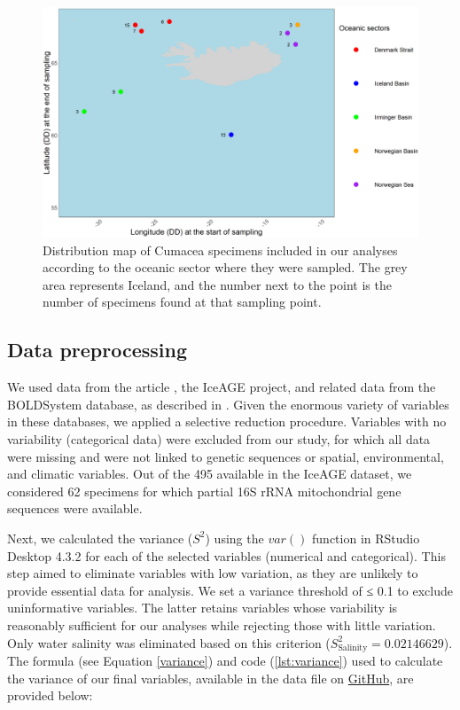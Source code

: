 \begin{figure}[htbp]
    \centering
    \includegraphics[width=\textwidth]{figuremap.png}
    \caption{Distribution map of Cumacea specimens included in our analyses according to the oceanic sector where they were sampled. The grey area represents Iceland, and the number next to the point is the number of specimens found at that sampling point. \label{fig:fig2}}
\end{figure}

\subsection{Data preprocessing}
We used data from the article \citep{uhlir_adding_2021}, the IceAGE project, and related data from the BOLDSystem database, as described in \citep{uhlir_adding_2021}. Given the enormous variety of variables in these databases, we applied a selective reduction procedure. Variables with no variability (categorical data) were excluded from our study, for which all data were missing and were not linked to genetic sequences or spatial, environmental, and climatic variables. Out of the 495 available in the IceAGE dataset, we considered 62 specimens for which partial 16S rRNA mitochondrial gene sequences were available.

Next, we calculated the variance ($S^2$) using the $var()$ function in RStudio Desktop 4.3.2 for each of the selected variables (numerical and categorical). This step aimed to eliminate variables with low variation, as they are unlikely to provide essential data for analysis. We set a variance threshold of ≤ 0.1 to exclude uninformative variables. The latter retains variables whose variability is reasonably sufficient for our analyses while rejecting those with little variation. Only water salinity was eliminated based on this criterion ($S^2_\text{Salinity} = 0.02146629$). The formula (see Equation \ref{variance}) and code (\autoref{lst:variance}) used to calculate the variance of our final variables, available in the data file on \href{https://github.com/tahiri-lab/Cumacea_aPhyloGeo}{GitHub}, are provided below:

